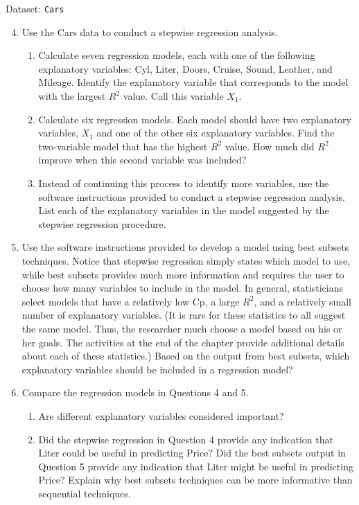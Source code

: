 \documentclass[
]{report}
\begin{document}
Dataset: \texttt{Cars}

\begin{enumerate}
 \setcounter{enumi}{3}
 \item Use the Cars data to conduct a stepwise regression analysis.

\begin{enumerate}
 \item Calculate seven regression models, each with one of the following explanatory variables: Cyl, Liter, Doors, Cruise, Sound, Leather, and Mileage. Identify the explanatory variable that corresponds to the model with the largest $\scriptstyle {R}^2$ value. Call this variable $\scriptstyle X_1$.

 \item Calculate six regression models. Each model should have two explanatory variables, $\scriptstyle X_1$ and one of the other six explanatory variables. Find the two-variable model that has the highest $\scriptstyle {R}^2$ value. How much did $\scriptstyle {R}^2$ improve when this second variable was included?

 \item Instead of continuing this process to identify more variables, use the software instructions provided to conduct a stepwise regression analysis. List each of the explanatory variables in the model suggested by the stepwise regression procedure.
\end{enumerate}
 
\item Use the software instructions provided to develop a model using best subsets techniques. Notice that stepwise regression simply states which model to use, while best subsets provides much more information and requires the user to choose how many variables to include in the model. In general, statisticians select models that have a relatively low Cp, a large $\scriptstyle {R}^2$, and a relatively small number of explanatory variables. (It is rare for these statistics to all suggest the same model. Thus, the researcher much choose a model based on his or her goals. The activities at the end of the chapter provide additional details about each of these statistics.) Based on the output from best subsets, which explanatory variables should be included in a regression model?

\item Compare the regression models in Questions 4 and 5.

 \begin{enumerate}
 \item Are different explanatory variables considered important?

 \item Did the stepwise regression in Question 4 provide any indication that Liter could be useful in predicting Price? Did the best subsets output in Question 5 provide any indication that Liter might be useful in predicting Price? Explain why best subsets techniques can be more informative than sequential techniques.
\end{enumerate}
\end{enumerate}
\end{document}
